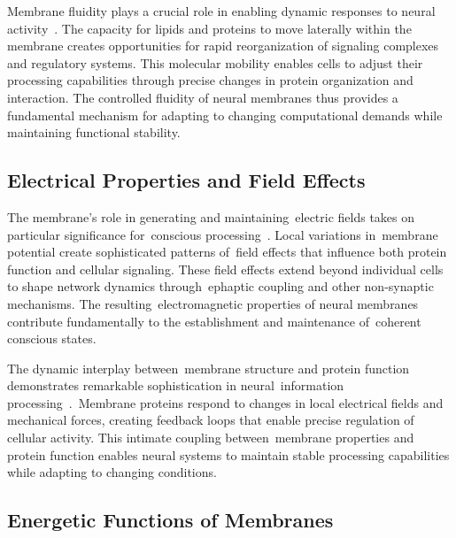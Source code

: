 Membrane fluidity plays a crucial role in enabling dynamic responses to neural activity~\cite{Lingwood2010, Garcia-Parajo2014}. The capacity for lipids and proteins to move laterally within the membrane creates opportunities for rapid reorganization of signaling complexes and regulatory systems. This molecular mobility enables cells to adjust their processing capabilities through precise changes in protein organization and interaction. The controlled fluidity of neural membranes thus provides a fundamental mechanism for adapting to changing computational demands while maintaining functional stability.

\subsection*{Electrical Properties and Field Effects~}

The membrane's role in generating and maintaining~electric fields takes on particular significance for~conscious processing~\cite{Bezanilla2002, hunt2024electromagnetic}. Local variations in~membrane potential create sophisticated patterns of~field effects that influence both protein function and cellular signaling. These field effects extend beyond individual cells to shape network dynamics through~ephaptic coupling and other non-synaptic mechanisms. The resulting~electromagnetic properties of neural membranes contribute fundamentally to the establishment and maintenance of~coherent conscious states.

The dynamic interplay between~membrane structure and protein function demonstrates remarkable sophistication in neural~information processing~\cite{Kusumi2012, Choquet2013}.~Membrane proteins respond to changes in local electrical fields and mechanical forces, creating feedback loops that enable precise regulation of cellular activity. This intimate coupling between~membrane properties and protein function enables neural systems to maintain stable processing capabilities while adapting to changing conditions.

\subsection*{Energetic Functions of Membranes~}

